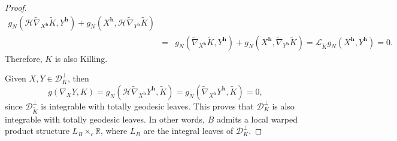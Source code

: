 \documentclass[12pt]{article}
\newcommand{\Miguel}[1]{\textcolor{miguel}{#1}}
\numberwithin{lemma}{section}
\newcommand{\h}{\mathbf{h}}
\begin{document}
{\begin{proof}
\begin{eqnarray*}
g_N\left( \mathcal{H}\widetilde{\nabla}_{X^{\h}}\widetilde{K},Y^{\h}\right) +  g_N\left(X^{\h}, \mathcal{H}\widetilde{\nabla}_{Y^{\h}}\widetilde{K}\right)\\&=&
g_N\left( \widetilde{\nabla}_{X^{\h}}\widetilde{K},Y^{\h}\right) +  g_N\left(X^{\h}, \widetilde{\nabla}_{Y^{\h}}\widetilde{K}\right)=
\mathcal{L}_{\widetilde{K}}g_N(X^{\h},Y^{\h})=0.\end{eqnarray*}
Therefore, $K$ is also Killing. 




Given $X,Y\in \mathcal{D}_{K}^{\perp}$, then $$g(\nabla_XY,K) = g_N\left(\mathcal{H}\widetilde{\nabla}_{X^{\h}}Y^{\h},\widetilde{K}\right) = g_N\left(\widetilde{\nabla}_{X^{\h}}Y^{\h},\widetilde{K}\right)=0,$$ since $\mathcal{D}_{\widetilde{K}}^{\perp}$ is integrable with totally geodesic leaves. This proves that $\mathcal{D}_{K}^{\perp}$ is also integrable with totally geodesic leaves. In other words, $B$ admits a local warped product structure $L_B\times_{c} \mathbb{R}$, where $L_B$ are the integral leaves of $\mathcal{D}_{K}^{\perp}$. 


\end{proof}}
\end{document}
